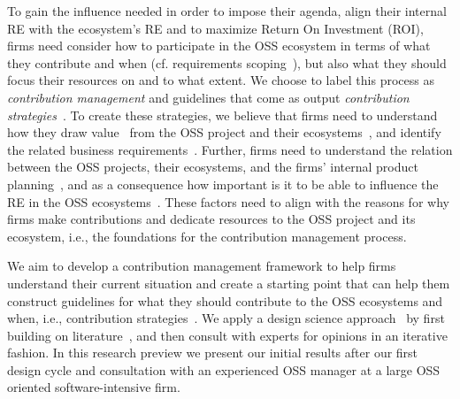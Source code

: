 \documentclass[a4paper]{llncs}
\begin{document}
To gain the influence needed in order to impose their agenda, align their internal RE with the ecosystem's RE and to maximize Return On Investment (ROI), firms need consider how to participate in the OSS ecosystem in terms of what they contribute and when (cf. requirements scoping~\cite{wnuk2012can}), but also what they should focus their resources on and to what extent. We choose to label this process as \emph{contribution management} and guidelines that come as output \emph{contribution strategies}~\cite{wnuk2012can}. To create these strategies, we believe that firms need to understand how they draw value~\cite{Aurum2007} from the OSS project and their ecosystems~\cite{jansen2009business}, and identify the related business requirements~\cite{wiegers2013software}. Further, firms need to understand the relation between the OSS projects, their ecosystems, and the firms' internal product planning~\cite{fricker2012software}, and as a consequence how important is it to be able to influence the RE in the OSS ecosystems~\cite{linaaker2016firms}. These factors need to align with the reasons for why firms make contributions and dedicate resources to the OSS project and its ecosystem, i.e., the foundations for the contribution management process.

We aim to develop a contribution management framework to help firms understand their current situation and create a starting point that can help them construct guidelines for what they should contribute to the OSS ecosystems and when, i.e., contribution strategies~\cite{wnuk2012can}. We apply a design science approach~\cite{wieringa2014design} by first building on literature~\cite{munir2015open}, and then consult with experts for opinions in an iterative fashion. In this research preview we present our initial results after our first design cycle and consultation with an experienced OSS manager at a large OSS oriented software-intensive firm.
\end{document}
